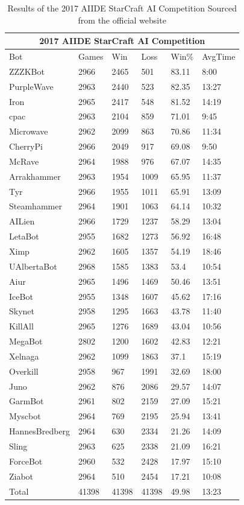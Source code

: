 \documentclass[journal]{IEEEtran}
\begin{document}
\appendix
\begin{table}
	\centering
	{}
	\begin{tabular} { |p{3cm}||p{1.5cm}|p{1.5cm}|p{1.5cm}|p{1.5cm}|p{1.5cm}|  } 
		\hline
		\multicolumn{6}{|c|}{2017 AIIDE StarCraft AI Competition} \\
		\hline
		Bot & Games & Win & Loss & Win\% & AvgTime\\
		\hline
		ZZZKBot	&	2966	&	2465	&	501	&	83.11	&	8:00	\\
		PurpleWave	&	2963	&	2440	&	523	&	82.35	&	13:27	\\
		Iron	&	2965	&	2417	&	548	&	81.52	&	14:19	\\
		cpac	&	2963	&	2104	&	859	&	71.01	&	9:45	\\
		Microwave	&	2962	&	2099	&	863	&	70.86	&	11:34	\\
		CherryPi	&	2966	&	2049	&	917	&	69.08	&	9:50	\\
		McRave	&	2964	&	1988	&	976	&	67.07	&	14:35	\\
		Arrakhammer	&	2963	&	1954	&	1009	&	65.95	&	11:37	\\
		Tyr	&	2966	&	1955	&	1011	&	65.91	&	13:09	\\
		Steamhammer	&	2964	&	1901	&	1063	&	64.14	&	10:32	\\
		AILien	&	2966	&	1729	&	1237	&	58.29	&	13:04	\\
		LetaBot	&	2955	&	1682	&	1273	&	56.92	&	16:48	\\
		Ximp	&	2962	&	1605	&	1357	&	54.19	&	18:46	\\
		UAlbertaBot	&	2968	&	1585	&	1383	&	53.4	&	10:54	\\
		Aiur	&	2965	&	1496	&	1469	&	50.46	&	13:51	\\
		IceBot	&	2955	&	1348	&	1607	&	45.62	&	17:16	\\
		Skynet	&	2958	&	1295	&	1663	&	43.78	&	11:40	\\
		KillAll	&	2965	&	1276	&	1689	&	43.04	&	10:56	\\
		MegaBot	&	2802	&	1200	&	1602	&	42.83	&	12:21	\\
		Xelnaga	&	2962	&	1099	&	1863	&	37.1	&	15:19	\\
		Overkill	&	2958	&	967	&	1991	&	32.69	&	18:00	\\
		Juno	&	2962	&	876	&	2086	&	29.57	&	14:07	\\
		GarmBot	&	2961	&	802	&	2159	&	27.09	&	15:21	\\
		Myscbot	&	2964	&	769	&	2195	&	25.94	&	13:41	\\
		HannesBredberg	&	2964	&	630	&	2334	&	21.26	&	14:09	\\
		Sling	&	2963	&	625	&	2338	&	21.09	&	16:21	\\
		ForceBot	&	2960	&	532	&	2428	&	17.97	&	15:10	\\
		Ziabot	&	2964	&	510	&	2454	&	17.21	&	10:08	\\
		Total	&	41398	&	41398	&	41398	&	49.98	&	13:23	\\
		\hline
	\end{tabular}
	\caption{Results of the 2017 AIIDE StarCraft AI Competition Sourced from the official website \cite{Results}}
	\label{table2}
\end{table}


\newpage
\listoftodos[Notes]

\end{document}

